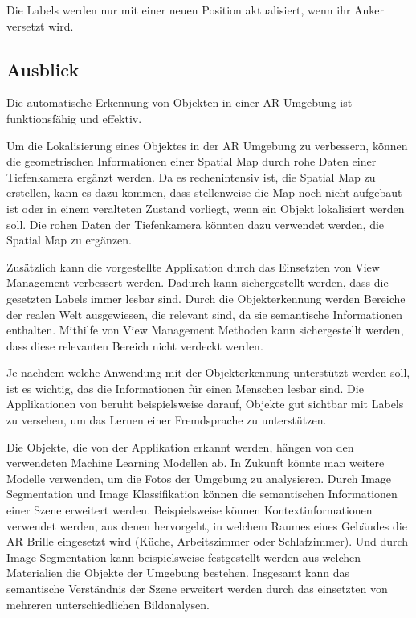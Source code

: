 Die Labels werden nur mit einer neuen Position aktualisiert, wenn ihr Anker versetzt wird.

\subsection{Ausblick}
Die automatische Erkennung von Objekten in einer AR Umgebung ist funktionsfähig und effektiv.

Um die Lokalisierung eines Objektes in der AR Umgebung zu verbessern, können die geometrischen Informationen einer Spatial Map durch rohe Daten einer Tiefenkamera ergänzt werden. Da es rechenintensiv ist, die Spatial Map zu erstellen, kann es dazu kommen, dass stellenweise die Map noch nicht aufgebaut ist oder in einem veralteten Zustand vorliegt, wenn ein Objekt lokalisiert werden soll. Die rohen Daten der Tiefenkamera könnten dazu verwendet werden, die Spatial Map zu ergänzen.\citep{depththoughimage}

Zusätzlich kann die vorgestellte Applikation durch das Einsetzten von View Management verbessert werden. Dadurch kann sichergestellt werden, dass die gesetzten Labels immer lesbar sind. Durch die Objekterkennung werden Bereiche der realen Welt ausgewiesen, die relevant sind, da sie semantische Informationen enthalten. Mithilfe von View Management Methoden kann sichergestellt werden, dass diese relevanten Bereich nicht verdeckt werden.

Je nachdem welche Anwendung mit der Objekterkennung unterstützt werden soll, ist es wichtig, das die Informationen für einen Menschen lesbar sind. Die Applikationen von \cite{LabelingLanguageLearning} beruht beispielsweise darauf, Objekte gut sichtbar mit Labels zu versehen, um das Lernen einer Fremdsprache zu unterstützen.

Die Objekte, die von der Applikation erkannt werden, hängen von den verwendeten Machine Learning Modellen ab. In Zukunft könnte man weitere Modelle verwenden, um die Fotos der Umgebung zu analysieren. Durch Image Segmentation und Image Klassifikation können die semantischen Informationen einer Szene erweitert werden. Beispielsweise können Kontextinformationen verwendet werden, aus denen hervorgeht, in welchem Raumes eines Gebäudes die AR Brille eingesetzt wird (Küche, Arbeitszimmer oder Schlafzimmer). Und durch Image Segmentation kann beispielsweise festgestellt werden aus welchen Materialien die Objekte der Umgebung bestehen. Insgesamt kann das semantische Verständnis der Szene erweitert werden durch das einsetzten von mehreren unterschiedlichen Bildanalysen.

